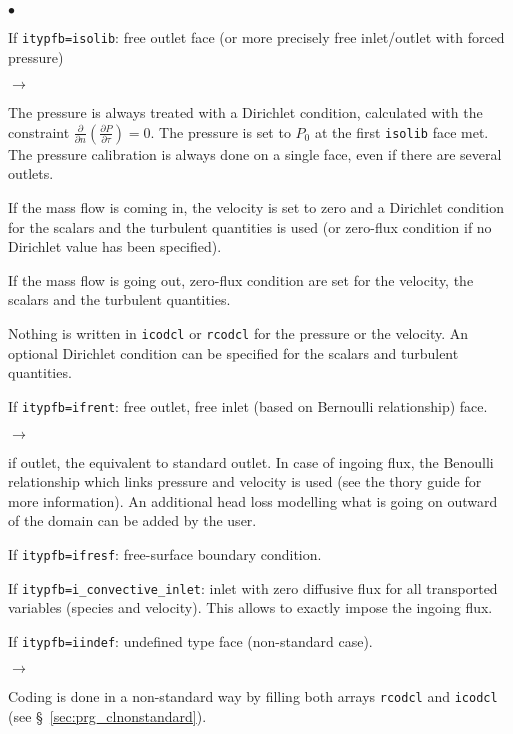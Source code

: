 {{{\begin{list}{$\bullet$}{}
\item If \texttt{itypfb=isolib}: free outlet face (or more precisely free
      inlet/outlet with forced pressure)
\begin{list}{$\rightarrow$}{}
\item The pressure is always treated with a Dirichlet condition, calculated
      with the constraint $\displaystyle \frac{\partial }{\partial n}\left(\frac{ \partial P}{\partial \tau}\right)=0$.
      The pressure is set to $P_0$ at the first \texttt{isolib} face met.
      The pressure calibration is always done on a single face, even if there are
      several outlets.
\item If the mass flow is coming in, the velocity is set to zero
      and a Dirichlet condition for the scalars and the turbulent quantities is used
      (or zero-flux condition if no Dirichlet value has been specified).
\item If the mass flow is going out, zero-flux condition are set for the velocity,
      the scalars and the turbulent quantities.
\item Nothing is written in \texttt{icodcl} or \texttt{rcodcl} for the pressure or
      the velocity. An optional Dirichlet condition can be specified for the scalars
      and turbulent quantities.
\end{list}

\item If \texttt{itypfb=ifrent}: free outlet, free inlet (based on Bernoulli relationship) face.

\begin{list}{$\rightarrow$}{}
\item if outlet, the equivalent to standard outlet.
      In case of ingoing flux, the Benoulli relationship which links pressure and velocity is used (see the thory guide for more information). An additional head loss modelling what is going on outward of the domain can be added by the user.
\end{list}

\item If \texttt{itypfb=ifresf}: free-surface boundary condition.

\item If \texttt{itypfb=i\_convective\_inlet}: inlet with zero diffusive flux for all transported variables (species and velocity). This allows to exactly impose the ingoing flux.

\item If \texttt{itypfb=iindef}: undefined type face (non-standard case).
\begin{list}{$\rightarrow$}{}
\item Coding is done in a non-standard way by filling both arrays \texttt{rcodcl} and
      \texttt{icodcl} (see \S~\ref{sec:prg_clnonstandard}).
\end{list}
\end{list}

}}}
